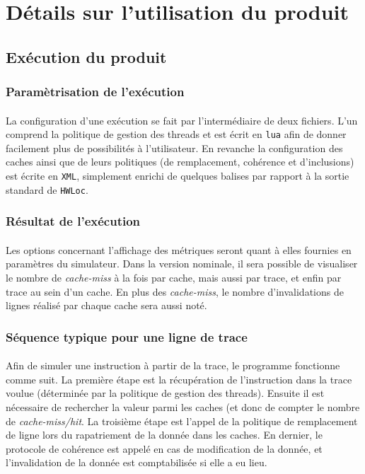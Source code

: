 \section{Détails sur l'utilisation du produit}


\subsection{Exécution du produit}

\subsubsection{Paramètrisation de l'exécution}
\paragraph{}
La configuration d'une exécution se fait par l'intermédiaire de deux fichiers. L'un comprend la politique de gestion des threads et est écrit en \texttt{lua} afin de donner facilement plus de possibilités à l'utilisateur. En revanche la configuration des caches ainsi que de leurs politiques (de remplacement, cohérence et d'inclusions) est écrite en \texttt{XML}, simplement enrichi de quelques balises par rapport à la sortie standard de \texttt{HWLoc}.

\subsubsection{Résultat de l'exécution}
\paragraph{}
Les options concernant l'affichage des métriques seront quant à elles fournies en paramètres du simulateur. Dans la version nominale, il sera possible de visualiser le nombre de \emph{cache-miss} à la fois par cache, mais aussi par trace, et enfin par trace au sein d'un cache. En plus des \emph{cache-miss}, le nombre d'invalidations de lignes réalisé par chaque cache sera aussi noté.

\subsubsection{Séquence typique pour une ligne de trace}
\paragraph{}
Afin de simuler une instruction à partir de la trace, le programme fonctionne comme suit. La première étape est la récupération de l'instruction dans la trace voulue (déterminée par la politique de gestion des threads). Ensuite il est nécessaire de rechercher la valeur parmi les caches (et donc de compter le nombre de \emph{cache-miss/hit}. La troisième étape est l'appel de la politique de remplacement de ligne lors du rapatriement de la donnée dans les caches. En dernier, le protocole de cohérence est appelé en cas de modification de la donnée, et l'invalidation de la donnée est comptabilisée si elle a eu lieu.

